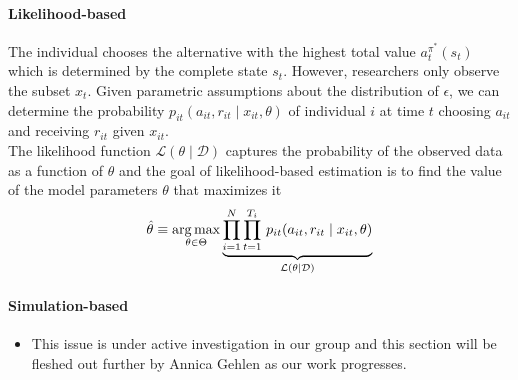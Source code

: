 \paragraph{Likelihood-based} The individual chooses the alternative with the highest total value $a_t^{\pi^*}(s_t)$ which is determined by the complete state $s_t$. However, researchers only observe the subset $x_t$. Given parametric assumptions about the distribution of $\epsilon$, we can determine the probability $p_{it}(a_{it}, r_{it} \mid x_{it}, \theta)$ of individual $i$ at time $t$ choosing $a_{it}$ and receiving $r_{it}$ given $x_{it}$.\\

\noindent The likelihood function $\mathcal{L}(\theta\mid\mathcal{D})$ captures the probability of the observed data as a function of $\theta$ and the goal of likelihood-based estimation is to find the value of the model parameters $\theta$ that maximizes it
%
\begin{align*}
  \hat{\theta} \equiv \operatorname*{arg\,max}_{\theta \in \Theta}  \underbrace{\prod^N_{i= 1} \prod^{T_i}_{t= 1}\, p_{it}(a_{it}, r_{it} \mid x_{it}, \theta)}_{\mathcal{L}(\theta\mid\mathcal{D})}
\end{align*}

\paragraph{Simulation-based}

\begin{itemize}
  \item This issue is under active investigation in our group and this section will be fleshed out further by Annica Gehlen as our work progresses.
\end{itemize}

